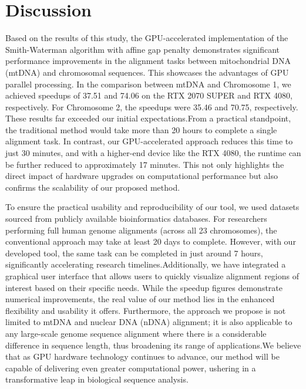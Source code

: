 \documentclass[PhD]{PHlab-thesis}
\begin{document}
\chapter{Discussion}
Based on the results of this study, the GPU-accelerated implementation of the Smith-Waterman algorithm with affine gap penalty demonstrates significant performance improvements in the alignment tasks between mitochondrial DNA (mtDNA) and chromosomal sequences. This showcases the advantages of GPU parallel processing. In the comparison between mtDNA and Chromosome 1, we achieved speedups of 37.51 and 74.06 on the RTX 2070 SUPER and RTX 4080, respectively. For Chromosome 2, the speedups were 35.46 and 70.75, respectively. These results far exceeded our initial expectations.From a practical standpoint, the traditional method would take more than 20 hours to complete a single alignment task. In contrast, our GPU-accelerated approach reduces this time to just 30 minutes, and with a higher-end device like the RTX 4080, the runtime can be further reduced to approximately 17 minutes. This not only highlights the direct impact of hardware upgrades on computational performance but also confirms the scalability of our proposed method.

To ensure the practical usability and reproducibility of our tool, we used datasets sourced from publicly available bioinformatics databases. For researchers performing full human genome alignments (across all 23 chromosomes), the conventional approach may take at least 20 days to complete. However, with our developed tool, the same task can be completed in just around 7 hours, significantly accelerating research timelines.Additionally, we have integrated a graphical user interface that allows users to quickly visualize alignment regions of interest based on their specific needs. While the speedup figures demonstrate numerical improvements, the real value of our method lies in the enhanced flexibility and usability it offers. Furthermore, the approach we propose is not limited to mtDNA and nuclear DNA (nDNA) alignment; it is also applicable to any large-scale genome sequence alignment where there is a considerable difference in sequence length, thus broadening its range of applications.We believe that as GPU hardware technology continues to advance, our method will be capable of delivering even greater computational power, ushering in a transformative leap in biological sequence analysis.
\end{document}
